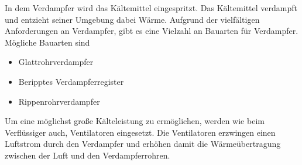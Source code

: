 In dem Verdampfer wird das Kältemittel eingespritzt. Das Kältemittel verdampft und entzieht seiner Umgebung dabei Wärme. Aufgrund der vielfältigen Anforderungen an Verdampfer, gibt es eine Vielzahl an Bauarten für Verdampfer. Mögliche Bauarten sind 

\begin{itemize}
\item Glattrohrverdampfer
\item Beripptes Verdampferregister
\item Rippenrohrverdampfer
\end{itemize}

Um eine möglichst große Kälteleistung zu ermöglichen, werden wie beim Verflüssiger auch, Ventilatoren eingesetzt. Die Ventilatoren erzwingen einen Luftstrom durch den Verdampfer und erhöhen damit die Wärmeübertragung zwischen der Luft und den Verdampferrohren. 










